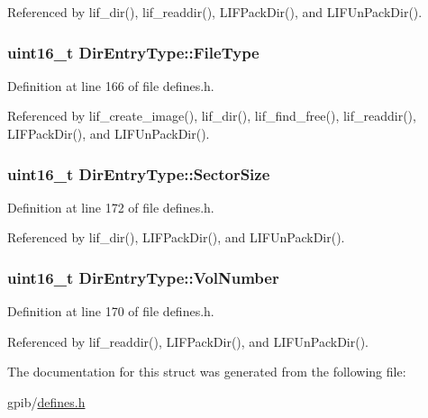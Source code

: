 Referenced by lif\+\_\+dir(), lif\+\_\+readdir(), L\+I\+F\+Pack\+Dir(), and L\+I\+F\+Un\+Pack\+Dir().

\subsubsection[{\texorpdfstring{File\+Type}{FileType}}]{\setlength{\rightskip}{0pt plus 5cm}uint16\+\_\+t Dir\+Entry\+Type\+::\+File\+Type}\hypertarget{structDirEntryType_a97b6ddc8d198c32bf4a29c4784ab7188}{}\label{structDirEntryType_a97b6ddc8d198c32bf4a29c4784ab7188}


Definition at line 166 of file defines.\+h.



Referenced by lif\+\_\+create\+\_\+image(), lif\+\_\+dir(), lif\+\_\+find\+\_\+free(), lif\+\_\+readdir(), L\+I\+F\+Pack\+Dir(), and L\+I\+F\+Un\+Pack\+Dir().

\subsubsection[{\texorpdfstring{Sector\+Size}{SectorSize}}]{\setlength{\rightskip}{0pt plus 5cm}uint16\+\_\+t Dir\+Entry\+Type\+::\+Sector\+Size}\hypertarget{structDirEntryType_ab92ab53cd08e0ffe0f0098c583ce5eba}{}\label{structDirEntryType_ab92ab53cd08e0ffe0f0098c583ce5eba}


Definition at line 172 of file defines.\+h.



Referenced by lif\+\_\+dir(), L\+I\+F\+Pack\+Dir(), and L\+I\+F\+Un\+Pack\+Dir().

\subsubsection[{\texorpdfstring{Vol\+Number}{VolNumber}}]{\setlength{\rightskip}{0pt plus 5cm}uint16\+\_\+t Dir\+Entry\+Type\+::\+Vol\+Number}\hypertarget{structDirEntryType_a2fe2eefd68aafcce0bb14bf53e4cba00}{}\label{structDirEntryType_a2fe2eefd68aafcce0bb14bf53e4cba00}


Definition at line 170 of file defines.\+h.



Referenced by lif\+\_\+readdir(), L\+I\+F\+Pack\+Dir(), and L\+I\+F\+Un\+Pack\+Dir().



The documentation for this struct was generated from the following file\+:\begin{DoxyCompactItemize}
\item 
gpib/\hyperlink{defines_8h}{defines.\+h}\end{DoxyCompactItemize}
